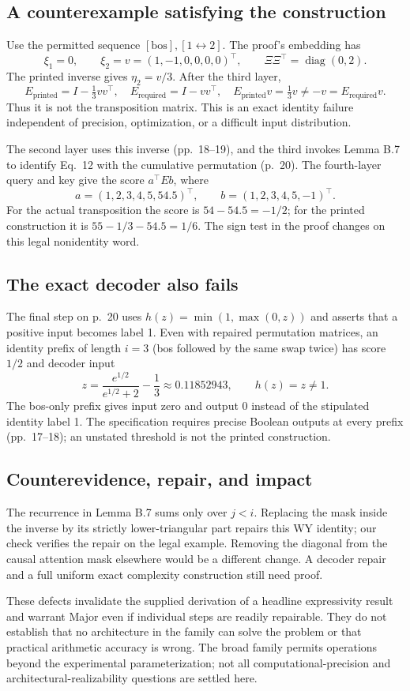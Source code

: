 \documentclass[10pt]{article}
\begin{document}
\subsection*{A counterexample satisfying the construction}
Use the permitted sequence \([\mathrm{bos}],[1\leftrightarrow2]\). The proof’s embedding has \[\xi_1=0,\qquad \xi_2=v=(1,-1,0,0,0,0)^\top,\qquad
 \Xi\Xi^\top=\operatorname{diag}(0,2).\] The printed inverse gives \(\eta_2=v/3\). After the third layer, \[E_{\mathrm{printed}}=I-\tfrac13 vv^\top,\quad
 E_{\mathrm{required}}=I-vv^\top,\quad
 E_{\mathrm{printed}}v=\tfrac13v\ne -v=E_{\mathrm{required}}v.\] Thus it is not the transposition matrix. This is an exact identity failure independent of precision, optimization, or a difficult input distribution.\par
The second layer uses this inverse (pp. 18–19), and the third invokes Lemma B.7 to identify Eq. 12 with the cumulative permutation (p. 20). The fourth-layer query and key give the score \(a^\top E b\), where \[a=(1,2,3,4,5,54.5)^\top,\qquad b=(1,2,3,4,5,-1)^\top.\] For the actual transposition the score is \(54-54.5=-1/2\); for the printed construction it is \(55-1/3-54.5=1/6\). The sign test in the proof changes on this legal nonidentity word.\par
\subsection*{The exact decoder also fails}
The final step on p. 20 uses \(h(z)=\min(1,\max(0,z))\) and asserts that a positive input becomes label 1. Even with repaired permutation matrices, an identity prefix of length \(i=3\) (bos followed by the same swap twice) has score \(1/2\) and decoder input \[z=\frac{e^{1/2}}{e^{1/2}+2}-\frac13\approx0.11852943,\qquad h(z)=z\ne1.\] The bos-only prefix gives input zero and output 0 instead of the stipulated identity label 1. The specification requires precise Boolean outputs at every prefix (pp. 17–18); an unstated threshold is not the printed construction.\par
\subsection*{Counterevidence, repair, and impact}
The recurrence in Lemma B.7 sums only over \(j<i\). Replacing the mask inside the inverse by its strictly lower-triangular part repairs this WY identity; our check verifies the repair on the legal example. Removing the diagonal from the causal attention mask elsewhere would be a different change. A decoder repair and a full uniform exact complexity construction still need proof.\par
These defects invalidate the supplied derivation of a headline expressivity result and warrant Major even if individual steps are readily repairable. They do not establish that no architecture in the family can solve the problem or that practical arithmetic accuracy is wrong. The broad family permits operations beyond the experimental parameterization; not all computational-precision and architectural-realizability questions are settled here.\par
\end{document}
